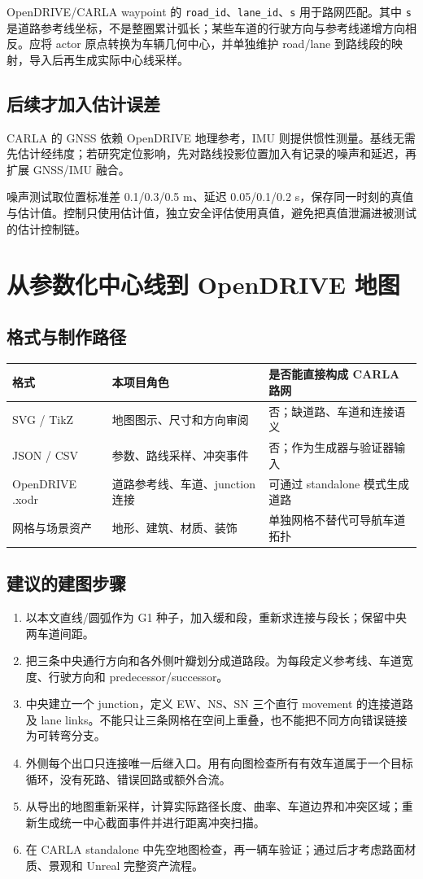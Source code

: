 \documentclass[UTF8,fontset=fandol,11pt,a4paper]{ctexart}
\newcommand{\page}[1]{\clearpage\section{#1}}
\begin{document}
OpenDRIVE/CARLA waypoint 的 \texttt{road\_id}、\texttt{lane\_id}、\texttt{s} 用于路网匹配\cite{carla_map}。其中 \texttt{s} 是道路参考线坐标，不是整圈累计弧长；某些车道的行驶方向与参考线递增方向相反。应将 actor 原点转换为车辆几何中心，并单独维护 road/lane 到路线段的映射，导入后再生成实际中心线采样。

\subsection{后续才加入估计误差}
CARLA 的 GNSS 依赖 OpenDRIVE 地理参考，IMU 则提供惯性测量\cite{carla_sensors}。基线无需先估计经纬度；若研究定位影响，先对路线投影位置加入有记录的噪声和延迟，再扩展 GNSS/IMU 融合。

噪声测试取位置标准差 0.1/0.3/0.5 m、延迟 0.05/0.1/0.2 s，保存同一时刻的真值与估计值。控制只使用估计值，独立安全评估使用真值，避免把真值泄漏进被测试的估计控制链。

\page{从参数化中心线到 OpenDRIVE 地图}
\subsection{格式与制作路径}
\begin{center}\small
\begin{tabular}{P{2.7cm}P{5cm}P{5.8cm}}\toprule
格式 & 本项目角色 & 是否能直接构成 CARLA 路网\\\midrule
SVG / TikZ & 地图图示、尺寸和方向审阅 & 否；缺道路、车道和连接语义\\
JSON / CSV & 参数、路线采样、冲突事件 & 否；作为生成器与验证器输入\\
OpenDRIVE .xodr & 道路参考线、车道、junction 连接 & 可通过 standalone 模式生成道路\cite{carla_odr}\\
网格与场景资产 & 地形、建筑、材质、装饰 & 单独网格不替代可导航车道拓扑\\\bottomrule
\end{tabular}\end{center}

\subsection{建议的建图步骤}
\begin{enumerate}
\item 以本文直线/圆弧作为 G1 种子，加入缓和段，重新求连接与段长；保留中央两车道间距。
\item 把三条中央通行方向和各外侧叶瓣划分成道路段。为每段定义参考线、车道宽度、行驶方向和 predecessor/successor。
\item 中央建立一个 junction，定义 EW、NS、SN 三个直行 movement 的连接道路及 lane links。不能只让三条网格在空间上重叠，也不能把不同方向错误链接为可转弯分支。
\item 外侧每个出口只连接唯一后继入口。用有向图检查所有有效车道属于一个目标循环，没有死路、错误回路或额外合流。
\item 从导出的地图重新采样，计算实际路径长度、曲率、车道边界和冲突区域；重新生成统一中心截面事件并进行距离冲突扫描。
\item 在 CARLA standalone 中先空地图检查，再一辆车验证；通过后才考虑路面材质、景观和 Unreal 完整资产流程。
\end{enumerate}
\end{document}
